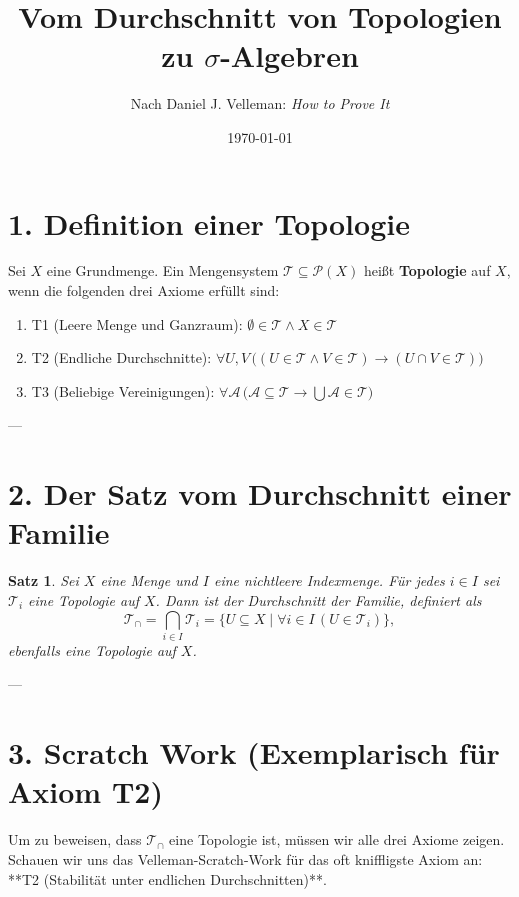 \documentclass{article}
\title{Vom Durchschnitt von Topologien zu $\sigma$-Algebren}
\author{Nach Daniel J. Velleman: \emph{How to Prove It}}
\date{\today}
\newtheorem{theorem}{Satz}
\begin{document}
\maketitle

\section*{1. Definition einer Topologie}

Sei $X$ eine Grundmenge. Ein Mengensystem $\mathcal{T} \subseteq \mathcal{P}(X)$ heißt \textbf{Topologie} auf $X$, wenn die folgenden drei Axiome erfüllt sind:
\begin{enumerate}
    \item T1 (Leere Menge und Ganzraum): $\emptyset \in \mathcal{T} \land X \in \mathcal{T}$
    \item T2 (Endliche Durchschnitte): $\forall U, V \, \big( (U \in \mathcal{T} \land V \in \mathcal{T}) \rightarrow (U \cap V \in \mathcal{T}) \big)$
    \item T3 (Beliebige Vereinigungen): $\forall \mathcal{A} \, \big( \mathcal{A} \subseteq \mathcal{T} \rightarrow \bigcup \mathcal{A} \in \mathcal{T} \big)$
\end{enumerate}

---

\section*{2. Der Satz vom Durchschnitt einer Familie}

\begin{theorem}
Sei $X$ eine Menge und $I$ eine nichtleere Indexmenge. Für jedes $i \in I$ sei $\mathcal{T}_i$ eine Topologie auf $X$. Dann ist der Durchschnitt der Familie, definiert als
\[
\mathcal{T}_{\cap} = \bigcap_{i \in I} \mathcal{T}_i = \{ U \subseteq X \mid \forall i \in I \, (U \in \mathcal{T}_i) \},
\]
ebenfalls eine Topologie auf $X$.
\end{theorem}

---

\section*{3. Scratch Work (Exemplarisch für Axiom T2)}

Um zu beweisen, dass $\mathcal{T}_{\cap}$ eine Topologie ist, müssen wir alle drei Axiome zeigen. Schauen wir uns das Velleman-Scratch-Work für das oft kniffligste Axiom an: **T2 (Stabilität unter endlichen Durchschnitten)**.
\end{document}
